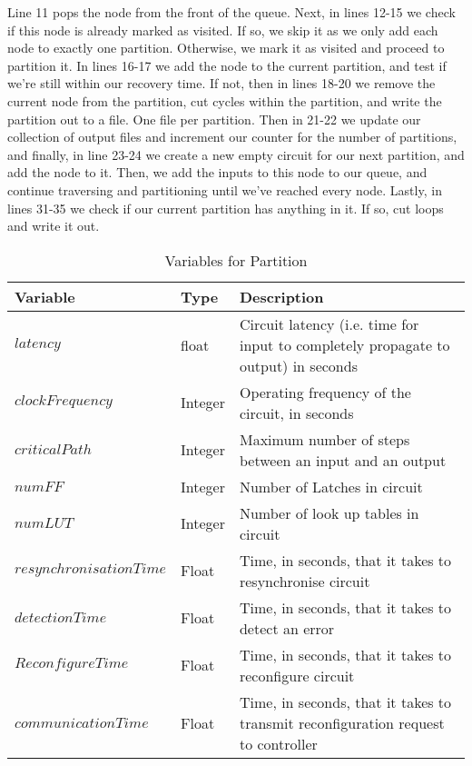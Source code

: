 \documentclass[12pt,draft,oneside]{article} %
\begin{document}
Line 11 pops the node from the front of the queue.
Next, in lines 12-15 we check if this node is already marked as visited. If so, we skip it as we only add each node to exactly one partition. Otherwise, we mark it as visited and proceed to partition it.
In lines 16-17 we add the node to the current partition, and test if we're still within our recovery time.
If not, then in lines 18-20 we remove the current node from the partition, cut cycles within the partition, and write the partition out to a file. One file per partition.
Then in 21-22 we update our collection of output files and increment our counter for the number of partitions, and finally, in line 23-24 we create a new empty circuit for our next partition, and add the node to it.
Then, we add the inputs to this node to our queue, and continue traversing and partitioning until we've reached every node.
Lastly, in lines 31-35 we check if our current partition has anything in it. If so, cut loops and write it out.
\begin{table}
    \begin{center}
        \begin{tabular}{lll}
        \toprule
        Variable & Type & Description\\
        \midrule
        $latency$ & float & Circuit latency (i.e. time for input to completely propagate to output) in seconds\\
        $clockFrequency$ & Integer & Operating frequency of the circuit, in seconds\\
        $criticalPath$ & Integer & Maximum number of steps between an input and an output\\
        $numFF$ & Integer & Number of Latches in circuit\\
        $numLUT$ & Integer & Number of look up tables in circuit\\
        $resynchronisationTime$ & Float & Time, in seconds, that it takes to resynchronise circuit\\
        $detectionTime$ & Float & Time, in seconds, that it takes to detect an error\\
        $ReconfigureTime$ & Float & Time, in seconds, that it takes to reconfigure circuit\\
        $communicationTime$ & Float & Time, in seconds, that it takes to transmit reconfiguration request to controller\\
        \bottomrule
        \end{tabular}
        \caption{Variables for Partition}
        \label{varPart}
    \end{center}
\end{table}
\end{document}
